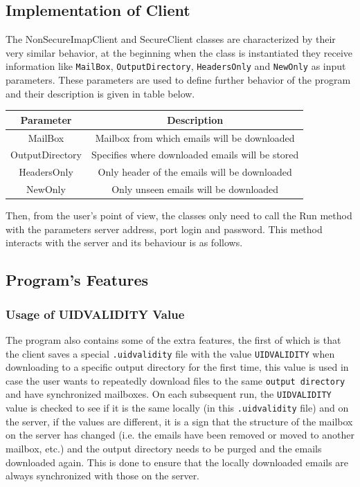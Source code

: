 \documentclass[a4paper,11pt]{article}
\begin{document}
\subsection{Implementation of Client}
The NonSecureImapClient and SecureClient classes are characterized by their very 
similar behavior, at the beginning when the class is instantiated they receive information 
like \verb!MailBox!, \verb!OutputDirectory!, \verb!HeadersOnly! and \verb!NewOnly! as input parameters. 
These parameters are used to define further behavior of the program and their description is given in table below.

\smallskip

\begin{center}
    \vspace{0.5cm} %
    \begin{tabular}{|c|c|}
        \hline
        \textbf{Parameter} & \textbf{Description} \\
        \hline
        MailBox & Mailbox from which emails will be downloaded \\
        \hline
        OutputDirectory & Specifies where downloaded emails will be stored \\
        \hline
        HeadersOnly & Only header of the emails will be downloaded \\
        \hline
        NewOnly & Only unseen emails will be downloaded \\
        \hline
    \end{tabular}
    \vspace{0.5cm} %
\end{center}

Then, from the user's point of view, the classes only need to call the Run method with the parameters 
server address, port login and password. This method interacts with the server and its behaviour is as follows.

\subsection{Program's Features}

\subsubsection{Usage of UIDVALIDITY Value}
The program also contains some of the extra features, the first of which is that the client 
saves a special \verb!.uidvalidity! file with the value \verb!UIDVALIDITY! when downloading 
to a specific output directory for the first time, this value is used in case the user wants 
to repeatedly download files to the same \verb!output directory! and have synchronized mailboxes. 
On each subsequent run, the \verb!UIDVALIDITY! value is checked to see if it is the same locally 
(in this \verb!.uidvalidity! file) and on the server, if the values are different, 
it is a sign that the structure of the mailbox on the server has changed (i.e. the emails 
have been removed or moved to another mailbox, etc.) and the output directory needs to be purged 
and the emails downloaded again. This is done to ensure that the locally downloaded emails 
are always synchronized with those on the server. 
\end{document}
